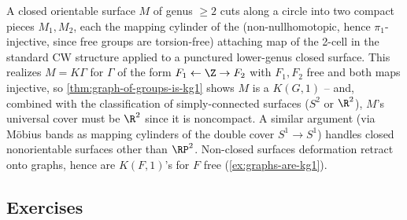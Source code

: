 \begin{example}
\label{ex:closed-surfaces-are-kg1}
A closed orientable surface $M$ of genus $\ge 2$ cuts along a circle into two
compact pieces $M_1,M_2$, each the mapping cylinder of the (non-nullhomotopic,
hence $\pi_1$-injective, since free groups are torsion-free) attaching map of the
2-cell in the standard CW structure applied to a punctured lower-genus closed
surface. This realizes $M = K\Gamma$ for $\Gamma$ of the form $F_1 \leftarrow \Z \to F_2$ with
$F_1,F_2$ free and both maps injective, so \cref{thm:graph-of-groups-is-kg1} shows $M$
is a $K(G,1)$ -- and, combined with the classification of simply-connected surfaces
($S^2$ or $\R^2$), $M$'s universal cover must be $\R^2$ since it is noncompact. A similar
argument (via M\"obius bands as mapping cylinders of the double cover $S^1\to S^1$)
handles closed nonorientable surfaces other than $\RP^2$. Non-closed surfaces
deformation retract onto graphs, hence are $K(F,1)$'s for $F$ free
(\cref{ex:graphs-are-kg1}).
\end{example}

\subsection*{Exercises}

